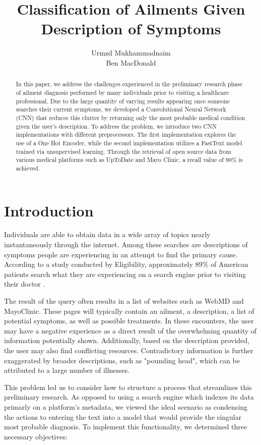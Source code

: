 \documentclass[12pt]{report}
\title{Classification of Ailments Given Description of Symptoms}
\author{Urmzd Mukhammadnaim \\ Ben MacDonald}
\begin{document}
\maketitle
\tableofcontents
\begin{abstract}
	In this paper, we address the challenges experienced in the preliminary research phase
	of ailment diagnosis performed by many individuals prior to visiting a
	healthcare professional. Due to the large quantity of varying results appearing
	once someone searches their current symptoms, we developed a Convolutional
	Neural Network (CNN) that reduces this clutter by returning only the most
	probable medical condition given the user's description.
	To address the problem, we introduce two CNN implementations with different
	preprocessors. The first implementation explores the use of a One Hot Encoder,
	while the second implementation utilizes a FastText model trained via
	unsupervised learning. Through the retrieval of open source data from various medical platforms such
	as UpToDate and Mayo Clinic, a recall value of 90\% is achieved.
\end{abstract}

\chapter{Introduction}
Individuals are able to obtain data in a wide array of topics nearly
instantaneously through the internet. Among these searches are descriptions of
symptoms people are experiencing in an attempt to find the primary cause.
According to a study conducted by Eligibility, approximately 89\% of American
patients search what they are experiencing on a search engine prior to visiting
their doctor \cite{guarino_2019}.

The result of the query often results in a list of websites such as WebMD and
MayoClinic. These pages will typically contain an ailment, a description,
a list of potential symptoms, as well as possible treatments. In these
encounters, the user may have a negative experience as a direct result of
the overwhelming quantity of information potentially shown. Additionally,
based on the description provided, the user may also find conflicting resources.
Contradictory information is further exaggerated by broader descriptions,
such as "pounding head", which can be attributed to a large number of illnesses.

This problem led us to consider how to structure a process that streamlines this
preliminary research. As opposed to using a search engine which indexes its data primarly
on a platform's metadata, we viewed the ideal scenario as condensing the actions
to entering the text into a model that would provide the singular most probable
diagnosis. To implement this functionality, we determined three necessary
objectives:
\end{document}
